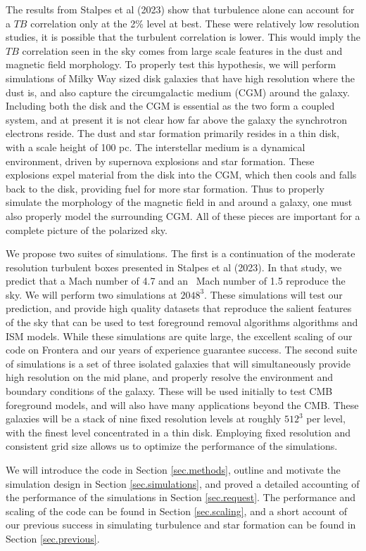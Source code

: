 The results from Stalpes et al (2023) show that turbulence alone can
account for a $TB$  correlation only at the 2\% level at best.   These were
relatively low resolution studies, it is possible that the turbulent correlation
is lower.  This would imply  the $TB$
correlation seen in the sky comes from large scale features in the dust and magnetic field
morphology.  To properly test this hypothesis, we will 
perform simulations of Milky Way sized disk galaxies 
that have high resolution where the dust is, and also capture the circumgalactic
medium (CGM) around the galaxy.  Including both the disk and the CGM is
essential as the two form a coupled system, and at present it is not clear how
far above the galaxy the synchrotron electrons reside.
The dust and star formation
primarily resides in a thin disk, with a scale height of 100 pc.  
The interstellar medium is a dynamical environment,
driven by supernova explosions and star formation.  
These explosions expel
material from the disk into the CGM, which then cools and falls back to the disk,
providing fuel for more star formation.  Thus to properly simulate the
morphology of the magnetic field in and around a galaxy, one must also properly model
the surrounding CGM.
 All of these pieces are important for a complete picture of the
polarized sky.

We propose two suites of simulations.  The first is a continuation of the
moderate resolution turbulent boxes presented in Stalpes et al (2023).  In that
study, we predict that a Mach number of 4.7 and an \alf\ Mach number of 1.5
reproduce the sky.  We will perform two simulations at $2048^3$.  These
simulations will test our prediction, and provide high quality datasets that
reproduce the salient features of the sky that can be used to test foreground
removal algorithms algorithms and ISM models.  While these simulations are quite
large, the excellent scaling of our code on Frontera and our years of experience guarantee success.
The second suite of simulations
is a set of three isolated galaxies that will simultaneously provide high
resolution on the mid plane, and properly resolve the environment and boundary
conditions of the galaxy.  These will be used initially to test CMB foreground
models, and will also have many applications beyond the CMB.  These galaxies
will be a stack of nine fixed resolution levels at roughly $512^3$ per level,
with the finest level concentrated in a thin disk.  Employing fixed
resolution and consistent grid size allows us to optimize the performance of
the simulations.

We will introduce the code in Section \ref{sec.methods}, outline and motivate
the simulation design in Section \ref{sec.simulations}, and proved a detailed
accounting of the performance of the simulations in Section \ref{sec.request}.
The performance and scaling of the code can be found in Section
\ref{sec.scaling}, and a short account of our previous success in simulating
turbulence and star formation can be found in Section \ref{sec.previous}.
